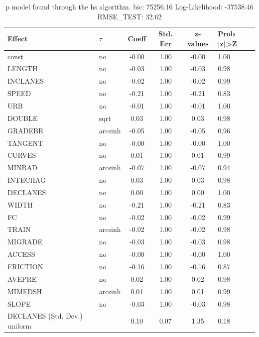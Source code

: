 \begin{table}
	\caption{p model found through the hs algorithm. bic: 75256.16 Log-Likelihood: -37538.46 RMSE_TEST: 32.62}
	\begin{center}
		\begin{tabular}{|l|l|c|c|c|l|}
			\hline
			Effect & $\tau$ & Coeff & Std. Err & z-values & Prob |z|>Z \\
			\hline
			const & no & -0.00 & 1.00 & -0.00 & 1.00 \\
			\hline
			LENGTH & no & -0.03 & 1.00 & -0.03 & 0.98 \\
			\hline
			INCLANES & no & -0.02 & 1.00 & -0.02 & 0.99 \\
			\hline
			SPEED & no & -0.21 & 1.00 & -0.21 & 0.83 \\
			\hline
			URB & no & -0.01 & 1.00 & -0.01 & 1.00 \\
			\hline
			DOUBLE & sqrt & 0.03 & 1.00 & 0.03 & 0.98 \\
			\hline
			GRADEBR & arcsinh & -0.05 & 1.00 & -0.05 & 0.96 \\
			\hline
			TANGENT & no & -0.00 & 1.00 & -0.00 & 1.00 \\
			\hline
			CURVES & no & 0.01 & 1.00 & 0.01 & 0.99 \\
			\hline
			MINRAD & arcsinh & -0.07 & 1.00 & -0.07 & 0.94 \\
			\hline
			INTECHAG & no & 0.03 & 1.00 & 0.03 & 0.98 \\
			\hline
			DECLANES & no & 0.00 & 1.00 & 0.00 & 1.00 \\
			\hline
			WIDTH & no & -0.21 & 1.00 & -0.21 & 0.83 \\
			\hline
			FC & no & -0.02 & 1.00 & -0.02 & 0.99 \\
			\hline
			TRAIN & arcsinh & -0.02 & 1.00 & -0.02 & 0.98 \\
			\hline
			MIGRADE & no & -0.03 & 1.00 & -0.03 & 0.98 \\
			\hline
			ACCESS & no & -0.00 & 1.00 & -0.00 & 1.00 \\
			\hline
			FRICTION & no & -0.16 & 1.00 & -0.16 & 0.87 \\
			\hline
			AVEPRE & no & 0.02 & 1.00 & 0.02 & 0.98 \\
			\hline
			MIMEDSH & arcsinh & 0.01 & 1.00 & 0.01 & 0.99 \\
			\hline
			SLOPE & no & -0.03 & 1.00 & -0.03 & 0.98 \\
			\hline
			DECLANES (Std. Dev.) uniform &  & 0.10 & 0.07 & 1.35 & 0.18 \\
			\hline

\end{tabular}
\end{center}
\end{table}
